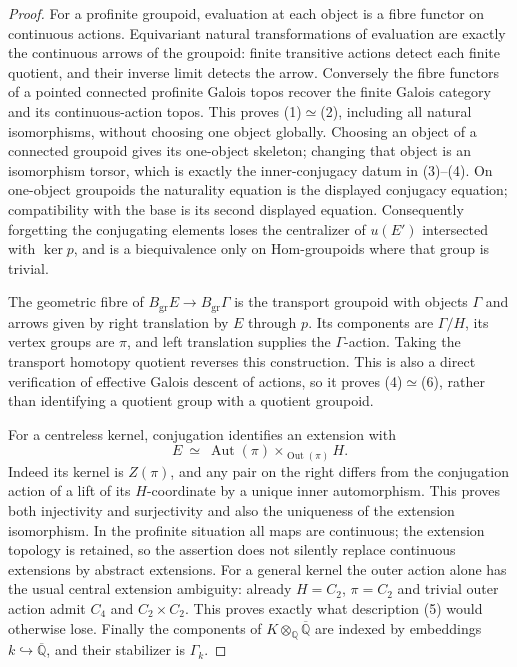 \begin{proof}
For a profinite groupoid, evaluation at each object is a fibre functor on
continuous actions. Equivariant natural transformations of evaluation are
exactly the continuous arrows of the groupoid: finite transitive actions
detect each finite quotient, and their inverse limit detects the arrow.
Conversely the fibre functors of a pointed connected profinite Galois topos
recover the finite Galois category and its continuous-action topos. This
proves (1)$\simeq$(2), including all natural isomorphisms, without choosing
one object globally. Choosing an object of a connected groupoid gives its
one-object skeleton; changing that object is an isomorphism torsor, which
is exactly the inner-conjugacy datum in (3)--(4). On one-object groupoids
the naturality equation is the displayed conjugacy equation; compatibility
with the base is its second displayed equation. Consequently forgetting
the conjugating elements loses the centralizer of $u(E')$ intersected with
$\ker p$, and is a biequivalence only on Hom-groupoids where that group is
trivial.

The geometric fibre of $B_{\mathrm{gr}}E\to B_{\mathrm{gr}}\Gamma$ is the
transport groupoid with objects $\Gamma$ and arrows given by right
translation by $E$ through $p$. Its components are $\Gamma/H$, its vertex
groups are $\pi$, and left translation supplies the $\Gamma$-action.
Taking the transport homotopy quotient reverses this construction. This is
also a direct verification of effective Galois descent of actions, so it
proves (4)$\simeq$(6), rather than identifying a quotient group with a
quotient groupoid.

For a centreless kernel, conjugation identifies an extension with
\[
 E\ \simeq\ \operatorname{Aut}(\pi)
       \mathbin{\times}_{\operatorname{Out}(\pi)} H.
\]
Indeed its kernel is $Z(\pi)$, and any pair on the right differs from the
conjugation action of a lift of its $H$-coordinate by a unique inner
automorphism. This proves both injectivity and surjectivity and also the
uniqueness of the extension isomorphism. In the profinite situation all
maps are continuous; the extension topology is retained, so the assertion
does not silently replace continuous extensions by abstract extensions.
For a general kernel the outer action alone has the usual central
extension ambiguity: already $H=C_2$, $\pi=C_2$ and trivial outer action
admit $C_4$ and $C_2\times C_2$. This proves exactly what description (5)
would otherwise lose. Finally the components of
$K\otimes_{\mathbb Q}\overline{\mathbb Q}$ are indexed by embeddings
$k\hookrightarrow\overline{\mathbb Q}$, and their stabilizer is $\Gamma_k$.
\end{proof}

